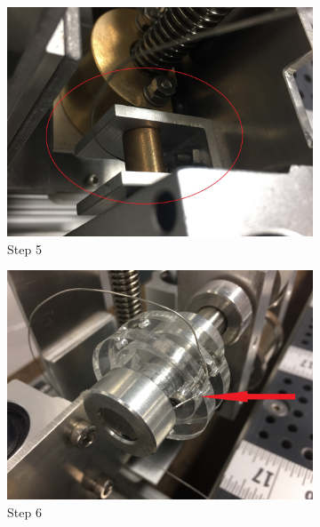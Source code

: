 \documentclass[titlepage,12pt,letter]{report}
\numberwithin{equation}{chapter}
\begin{document}
\begin{enumerate}[itemsep = 5pt,topsep=0pt]
\begin{figure}[H]
	\centering
	\begin{subfigure}[b]{.475\textwidth}
		\centering
		\includegraphics[width=\textwidth]{./Figures/Wire_mounting/5.jpg}
		\caption{Step 5}
	\end{subfigure}
	\begin{subfigure}[b]{.475\textwidth}
		\centering
		\includegraphics[width=\textwidth]{./Figures/Wire_mounting/6.jpg}
		\caption{Step 6}
	\end{subfigure}	
	\centering
	\begin{subfigure}[b]{.475\textwidth}
		\centering

\end{subfigure}
\end{figure}
\end{enumerate}
\end{document}
